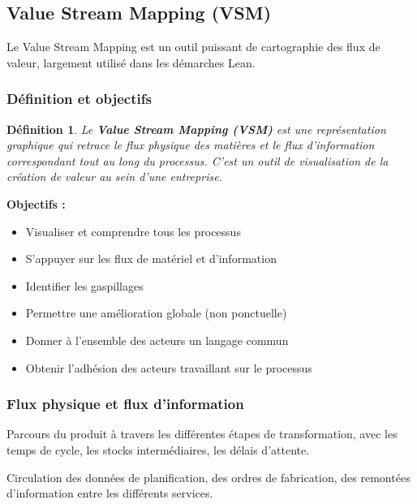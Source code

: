 \documentclass[a4paper,12pt]{article}
\newtheorem{definition}{Définition}[section]
\begin{document}
\subsection{Value Stream Mapping (VSM)}

Le Value Stream Mapping est un outil puissant de cartographie des flux de valeur, largement utilisé dans les démarches Lean.

\subsubsection{Définition et objectifs}

\begin{definition}
Le \textbf{Value Stream Mapping (VSM)} est une représentation graphique qui retrace le flux physique des matières et le flux d'information correspondant tout au long du processus. C'est un outil de visualisation de la création de valeur au sein d'une entreprise.
\end{definition}

\textbf{Objectifs :}
\begin{itemize}
    \item Visualiser et comprendre tous les processus
    \item S'appuyer sur les flux de matériel et d'information
    \item Identifier les gaspillages
    \item Permettre une amélioration globale (non ponctuelle)
    \item Donner à l'ensemble des acteurs un langage commun
    \item Obtenir l'adhésion des acteurs travaillant sur le processus
\end{itemize}

\subsubsection{Flux physique et flux d'information}

\begin{description}[labelwidth=3.5cm]
    \item[Flux physique] Parcours du produit à travers les différentes étapes de transformation, avec les temps de cycle, les stocks intermédiaires, les délais d'attente.
    
    \item[Flux d'information] Circulation des données de planification, des ordres de fabrication, des remontées d'information entre les différents services.
\end{description}
\end{document}
